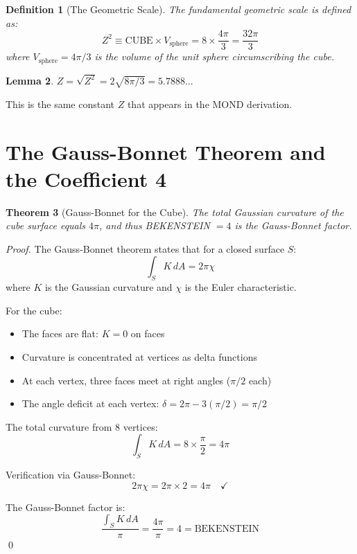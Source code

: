 \documentclass[twocolumn,showpacs,preprintnumbers,amsmath,amssymb,prd]{revtex4-2}
\newtheorem{theorem}{Theorem}[section]
\newtheorem{lemma}[theorem]{Lemma}
\newtheorem{definition}[theorem]{Definition}
\begin{document}
\begin{definition}[The Geometric Scale]
The fundamental geometric scale is defined as:
\begin{equation}
Z^2 \equiv \text{CUBE} \times V_{\text{sphere}} = 8 \times \frac{4\pi}{3} = \frac{32\pi}{3}
\end{equation}
where $V_{\text{sphere}} = 4\pi/3$ is the volume of the unit sphere circumscribing the cube.
\end{definition}

\begin{lemma}
\label{lem:Z}
$Z = \sqrt{Z^2} = 2\sqrt{8\pi/3} = 5.7888...$
\end{lemma}

This is the same constant $Z$ that appears in the MOND derivation.

\section{The Gauss-Bonnet Theorem and the Coefficient 4}

\begin{theorem}[Gauss-Bonnet for the Cube]
\label{thm:gaussbonnet}
The total Gaussian curvature of the cube surface equals $4\pi$, and thus BEKENSTEIN $= 4$ is the Gauss-Bonnet factor.
\end{theorem}

\begin{proof}
The Gauss-Bonnet theorem states that for a closed surface $S$:
\begin{equation}
\int_S K \, dA = 2\pi\chi
\end{equation}
where $K$ is the Gaussian curvature and $\chi$ is the Euler characteristic.

For the cube:
\begin{itemize}
\item The faces are flat: $K = 0$ on faces
\item Curvature is concentrated at vertices as delta functions
\item At each vertex, three faces meet at right angles ($\pi/2$ each)
\item The angle deficit at each vertex: $\delta = 2\pi - 3(\pi/2) = \pi/2$
\end{itemize}

The total curvature from 8 vertices:
\begin{equation}
\int_S K \, dA = 8 \times \frac{\pi}{2} = 4\pi
\end{equation}

Verification via Gauss-Bonnet:
\begin{equation}
2\pi\chi = 2\pi \times 2 = 4\pi \quad \checkmark
\end{equation}

The Gauss-Bonnet factor is:
\begin{equation}
\frac{\int_S K \, dA}{\pi} = \frac{4\pi}{\pi} = 4 = \text{BEKENSTEIN}
\end{equation}
\qed
\end{proof}
\end{document}
